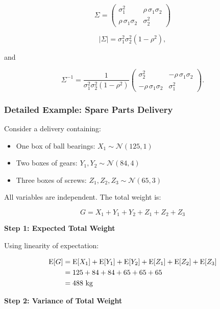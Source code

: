 \[
    \Sigma =
    \begin{pmatrix}
    \sigma_1^2 & \rho\, \sigma_1 \sigma_2 \\[4pt]
    \rho\, \sigma_1 \sigma_2 & \sigma_2^2
    \end{pmatrix}
\]

\[
    |\Sigma|
    =
    \sigma_1^{2}\sigma_2^{2}(1-\rho^{2}),
\]

and

\[
    \Sigma^{-1}
    =
    \frac{1}{\sigma_1^{2}\sigma_2^{2}(1-\rho^{2})}
    \begin{pmatrix}
    \sigma_2^{2} & -\rho\, \sigma_1\sigma_2 \\[4pt]
    -\rho\, \sigma_1\sigma_2 & \sigma_1^{2}
    \end{pmatrix}.
\]

\subsubsection{Detailed Example: Spare Parts Delivery}

Consider a delivery containing:

\begin{itemize}

    \item One box of ball bearings: \(X_1 \sim \mathcal{N}(125, 1)\)

    \item Two boxes of gears: \(Y_1, Y_2 \sim \mathcal{N}(84, 4)\)

    \item Three boxes of screws: \(Z_1, Z_2, Z_3 \sim \mathcal{N}(65, 3)\)

\end{itemize}

All variables are independent. The total weight is:

\[
    G = X_1 + Y_1 + Y_2 + Z_1 + Z_2 + Z_3
\]

\textbf{Step 1: Expected Total Weight}

Using linearity of expectation:

\begin{align*}
    \mathrm{E}[G] &= \mathrm{E}[X_1] + \mathrm{E}[Y_1] + \mathrm{E}[Y_2] + \mathrm{E}[Z_1] + \mathrm{E}[Z_2] + \mathrm{E}[Z_3] \\
    &= 125 + 84 + 84 + 65 + 65 + 65 \\
    &= 488 \text{ kg}
\end{align*}

\textbf{Step 2: Variance of Total Weight}


